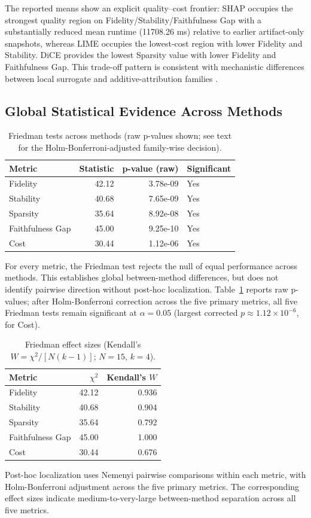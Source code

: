 \documentclass[twoside,11pt]{article}
\begin{document}
The reported means show an explicit quality--cost frontier: SHAP occupies the
strongest quality region on Fidelity/Stability/Faithfulness Gap with a
substantially reduced mean runtime (11708.26 ms) relative to earlier
artifact-only snapshots, whereas LIME occupies the lowest-cost region with
lower Fidelity and Stability. DiCE provides the lowest Sparsity value with
lower Fidelity and Faithfulness Gap. This trade-off pattern is consistent with
mechanistic differences between local surrogate and additive-attribution
families \citep{ribeiro2016lime,lundberg2017shap}.

\subsection{Global Statistical Evidence Across Methods}
\begin{table}[h]
\centering
\caption{Friedman tests across methods (raw p-values shown; see text for the
Holm-Bonferroni-adjusted family-wise decision).}
\begin{tabular}{lrrl}
\toprule
Metric & Statistic & p-value (raw) & Significant \\
\midrule
Fidelity         & 42.12 & 3.78e-09 & Yes \\
Stability        & 40.68 & 7.65e-09 & Yes \\
Sparsity         & 35.64 & 8.92e-08 & Yes \\
Faithfulness Gap & 45.00 & 9.25e-10 & Yes \\
Cost             & 30.44 & 1.12e-06 & Yes \\
\bottomrule
\end{tabular}
\label{tab:friedman}
\end{table}

For every metric, the Friedman test rejects the null of equal performance across
methods. This establishes global between-method differences, but does not
identify pairwise direction without post-hoc localization. Table~\ref{tab:friedman}
reports raw p-values; after Holm-Bonferroni correction across the five primary
metrics, all five Friedman tests remain significant at $\alpha=0.05$
(largest corrected $p\approx 1.12\times10^{-6}$, for Cost).
\begin{table}[h]
\centering
\caption{Friedman effect sizes (Kendall's $W=\chi^2/[N(k-1)]$; $N=15$, $k=4$).}
\begin{tabular}{lrr}
\toprule
Metric & $\chi^2$ & Kendall's $W$ \\
\midrule
Fidelity         & 42.12 & 0.936 \\
Stability        & 40.68 & 0.904 \\
Sparsity         & 35.64 & 0.792 \\
Faithfulness Gap & 45.00 & 1.000 \\
Cost             & 30.44 & 0.676 \\
\bottomrule
\end{tabular}
\label{tab:friedman-effect-size}
\end{table}
Post-hoc localization uses Nemenyi pairwise comparisons within each metric,
with Holm-Bonferroni adjustment across the five primary metrics.
The corresponding effect sizes indicate medium-to-very-large between-method
separation across all five metrics.
\end{document}
